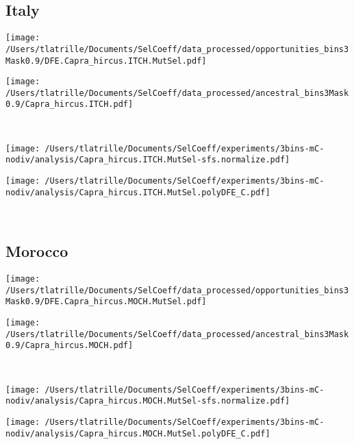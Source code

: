 \documentclass{article}
\begin{document}
    \subsection{Italy}

    \begin{minipage}{0.49\linewidth}
        \texttt{[image: /Users/tlatrille/Documents/SelCoeff/data\_processed/opportunities\_bins3Mask0.9/DFE.Capra\_hircus.ITCH.MutSel.pdf]}
    \end{minipage}
    \begin{minipage}{0.49\linewidth}
        \texttt{[image: /Users/tlatrille/Documents/SelCoeff/data\_processed/ancestral\_bins3Mask0.9/Capra\_hircus.ITCH.pdf]}
    \end{minipage}
    \\
    \begin{minipage}{0.49\linewidth}
        \texttt{[image: /Users/tlatrille/Documents/SelCoeff/experiments/3bins-mC-nodiv/analysis/Capra\_hircus.ITCH.MutSel-sfs.normalize.pdf]}
    \end{minipage}
    \begin{minipage}{0.49\linewidth}
        \texttt{[image: /Users/tlatrille/Documents/SelCoeff/experiments/3bins-mC-nodiv/analysis/Capra\_hircus.ITCH.MutSel.polyDFE\_C.pdf]}
    \end{minipage}
    \\
    \subsection{Morocco}

    \begin{minipage}{0.49\linewidth}
        \texttt{[image: /Users/tlatrille/Documents/SelCoeff/data\_processed/opportunities\_bins3Mask0.9/DFE.Capra\_hircus.MOCH.MutSel.pdf]}
    \end{minipage}
    \begin{minipage}{0.49\linewidth}
        \texttt{[image: /Users/tlatrille/Documents/SelCoeff/data\_processed/ancestral\_bins3Mask0.9/Capra\_hircus.MOCH.pdf]}
    \end{minipage}
    \\
    \begin{minipage}{0.49\linewidth}
        \texttt{[image: /Users/tlatrille/Documents/SelCoeff/experiments/3bins-mC-nodiv/analysis/Capra\_hircus.MOCH.MutSel-sfs.normalize.pdf]}
    \end{minipage}
    \begin{minipage}{0.49\linewidth}
        \texttt{[image: /Users/tlatrille/Documents/SelCoeff/experiments/3bins-mC-nodiv/analysis/Capra\_hircus.MOCH.MutSel.polyDFE\_C.pdf]}
    \end{minipage}
    \\
\end{document}
